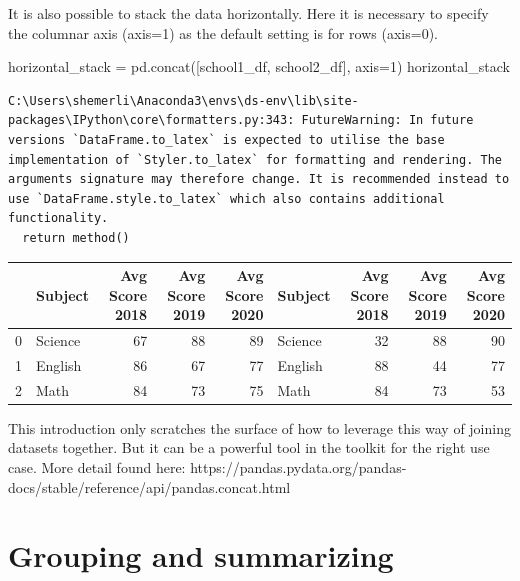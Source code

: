 \documentclass[
  letterpaper,
  DIV=11,
  numbers=noendperiod]{scrreprt}
\newenvironment{Shaded}{\begin{snugshade}}{\end{snugshade}}
\newcommand{\DecValTok}[1]{\textcolor[rgb]{0.68,0.00,0.00}{#1}}
\newcommand{\NormalTok}[1]{\textcolor[rgb]{0.00,0.23,0.31}{#1}}
\newcommand{\OperatorTok}[1]{\textcolor[rgb]{0.37,0.37,0.37}{#1}}
\begin{document}
It is also possible to stack the data horizontally. Here it is necessary
to specify the columnar axis (axis=1) as the default setting is for rows
(axis=0).

\begin{Shaded}
\begin{Highlighting}[]
\NormalTok{horizontal\_stack }\OperatorTok{=}\NormalTok{ pd.concat([school1\_df, school2\_df], axis}\OperatorTok{=}\DecValTok{1}\NormalTok{)}
\NormalTok{horizontal\_stack}
\end{Highlighting}
\end{Shaded}

\begin{verbatim}
C:\Users\shemerli\Anaconda3\envs\ds-env\lib\site-packages\IPython\core\formatters.py:343: FutureWarning: In future versions `DataFrame.to_latex` is expected to utilise the base implementation of `Styler.to_latex` for formatting and rendering. The arguments signature may therefore change. It is recommended instead to use `DataFrame.style.to_latex` which also contains additional functionality.
  return method()
\end{verbatim}

\begin{tabular}{llrrrlrrr}
\toprule
{} &  Subject &  Avg Score 2018 &  Avg Score 2019 &  Avg Score 2020 &  Subject &  Avg Score 2018 &  Avg Score 2019 &  Avg Score 2020 \\
\midrule
0 &  Science &              67 &              88 &              89 &  Science &              32 &              88 &              90 \\
1 &  English &              86 &              67 &              77 &  English &              88 &              44 &              77 \\
2 &     Math &              84 &              73 &              75 &     Math &              84 &              73 &              53 \\
\bottomrule
\end{tabular}

This introduction only scratches the surface of how to leverage this way
of joining datasets together. But it can be a powerful tool in the
toolkit for the right use case. More detail found here:
https://pandas.pydata.org/pandas-docs/stable/reference/api/pandas.concat.html

\hypertarget{grouping-and-summarizing}{%
\section{Grouping and summarizing}\label{grouping-and-summarizing}}
\end{document}
